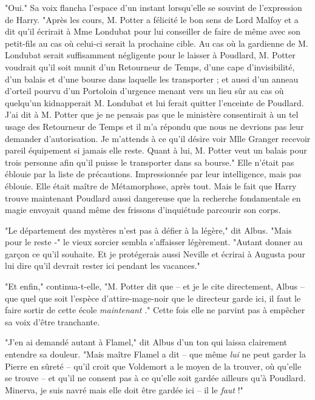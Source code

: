 "Oui." Sa voix flancha l'espace d'un instant lorsqu'elle se souvint de l'expression de Harry. "Après les cours, M. Potter a félicité le bon sens de Lord Malfoy et a dit qu'il écrirait à Mme Londubat pour lui conseiller de faire de même avec son petit-fils au cas où celui-ci serait la prochaine cible. Au cas où la gardienne de M. Londubat serait suffisamment négligente pour le laisser à Poudlard, M. Potter voudrait qu'il soit munit d'un Retourneur de Temps, d'une cape d'invisibilité, d'un balais et d'une bourse dans laquelle les transporter ; et aussi d'un anneau d'orteil pourvu d'un Portoloin d'urgence menant vers un lieu sûr au cas où quelqu'un kidnapperait M. Londubat et lui ferait quitter l'enceinte de Poudlard. J'ai dit à M. Potter que je ne pensais pas que le ministère consentirait à un tel usage des Retourneur de Temps et il m'a répondu que nous ne devrions pas leur demander d'autorisation. Je m'attends à ce qu'il désire voir Mlle Granger recevoir pareil équipement si jamais elle reste. Quant à lui, M. Potter veut un balais pour trois personne afin qu'il puisse le transporter dans sa bourse." Elle n'était pas éblouie par la liste de précautions. Impressionnée par leur intelligence, mais pas éblouie. Elle était maître de Métamorphose, après tout. Mais le fait que Harry trouve maintenant Poudlard aussi dangereuse que la recherche fondamentale en magie envoyait quand même des frissons d'inquiétude parcourir son corps.

"Le département des mystères n'est pas à défier à la légère," dit Albus. "Mais pour le reste -" le vieux sorcier sembla s'affaisser légèrement. "Autant donner au garçon ce qu'il souhaite. Et je protégerais aussi Neville et écrirai à Augusta pour lui dire qu'il devrait rester ici pendant les vacances."

"Et enfin," continua-t-elle, "M. Potter dit que – et je le cite directement, Albus – que quel que soit l'espèce d'attire-mage-noir que le directeur garde ici, il faut le faire sortir de cette école \emph{maintenant} ." Cette fois elle ne parvint pas à empêcher sa voix d'être tranchante.

"J'en ai demandé autant à Flamel," dit Albus d'un ton qui laissa clairement entendre sa douleur. "Mais maître Flamel a dit – que même \emph{lui}  ne peut garder la Pierre en sûreté – qu'il croit que Voldemort a le moyen de la trouver, où qu'elle se trouve – et qu'il ne consent pas à ce qu'elle soit gardée ailleurs qu'à Poudlard. Minerva, je suis navré mais elle doit être gardée ici – il le \emph{faut}  !"

